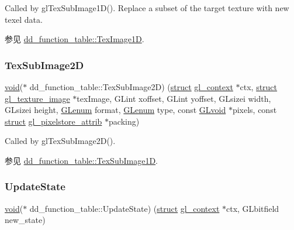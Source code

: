 Called by gl\+Tex\+Sub\+Image1\+D(). Replace a subset of the target texture with new texel data. \begin{DoxySeeAlso}{参见}
\hyperlink{structdd__function__table_a0907a18e4f97b0e8f36e50d8f5e7e369}{dd\+\_\+function\+\_\+table\+::\+Tex\+Image1D}. 
\end{DoxySeeAlso}
\mbox{\label{structdd__function__table_ac5d434d3f197b6bd61e01311145d7244}} 
\subsubsection{\texorpdfstring{Tex\+Sub\+Image2D}{TexSubImage2D}}
{\footnotesize\ttfamily \hyperlink{interfacevoid}{void}($\ast$ dd\+\_\+function\+\_\+table\+::\+Tex\+Sub\+Image2D) (\hyperlink{interfacestruct}{struct} \hyperlink{structgl__context}{gl\+\_\+context} $\ast$ctx, \hyperlink{interfacestruct}{struct} \hyperlink{structgl__texture__image}{gl\+\_\+texture\+\_\+image} $\ast$tex\+Image, G\+Lint xoffset, G\+Lint yoffset, G\+Lsizei width, G\+Lsizei height, \hyperlink{interfacevoid}{G\+Lenum} format, \hyperlink{interfacevoid}{G\+Lenum} type, const \hyperlink{interfacevoid}{G\+Lvoid} $\ast$pixels, const \hyperlink{interfacestruct}{struct} \hyperlink{structgl__pixelstore__attrib}{gl\+\_\+pixelstore\+\_\+attrib} $\ast$packing)}

Called by gl\+Tex\+Sub\+Image2\+D().

\begin{DoxySeeAlso}{参见}
\hyperlink{structdd__function__table_aa633b8ffb5cbcacb00177fe255481faa}{dd\+\_\+function\+\_\+table\+::\+Tex\+Sub\+Image1D}. 
\end{DoxySeeAlso}
\mbox{\label{structdd__function__table_a4275da33e8cc71c5e39a64759d5d3b38}} 
\subsubsection{\texorpdfstring{Update\+State}{UpdateState}}
{\footnotesize\ttfamily \hyperlink{interfacevoid}{void}($\ast$ dd\+\_\+function\+\_\+table\+::\+Update\+State) (\hyperlink{interfacestruct}{struct} \hyperlink{structgl__context}{gl\+\_\+context} $\ast$ctx, G\+Lbitfield new\+\_\+state)}

